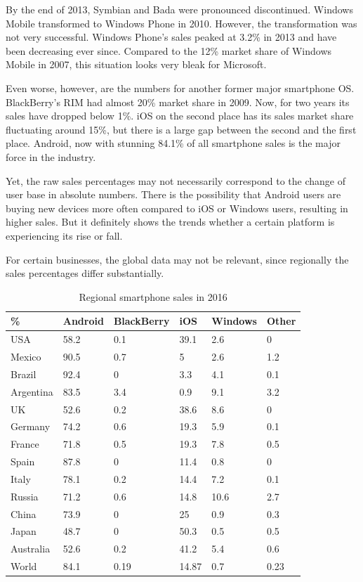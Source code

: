 \documentclass[english,master,public,dept460,male,cpdeclaration,oneside]{diploma}
\begin{document}
By the end of 2013, Symbian and Bada were pronounced discontinued. Windows Mobile transformed to Windows Phone in 2010. However, the transformation was not very successful. Windows Phone’s sales peaked at 3.2\% in 2013 and have been decreasing ever since. Compared to the 12\% market share of Windows Mobile in 2007, this situation looks very bleak for Microsoft. 

Even worse, however, are the numbers for another former major smartphone OS. BlackBerry’s RIM had almost 20\% market share in 2009. Now, for two years its sales have dropped below 1\%. iOS on the second place has its sales market share fluctuating around 15\%, but there is a large gap between the second and the first place. Android, now with stunning 84.1\% of all smartphone sales is the major force in the industry. 

Yet, the raw sales percentages may not necessarily correspond to the change of user base in absolute numbers. There is the possibility that Android users are buying new devices more often compared to iOS or Windows users, resulting in higher sales. But it definitely shows the trends whether a certain platform is experiencing its rise or fall.

For certain businesses, the global data may not be relevant, since regionally the sales percentages differ substantially.

\begin{table}
	\centering
	\caption{Regional smartphone sales in 2016}
	\begin{tabular}{l l l l l l}
		\toprule
		\% & Android & BlackBerry & iOS & Windows & Other \\
		\midrule
		USA & 58.2 & 0.1 & 39.1 & 2.6 & 0 \\
		Mexico & 90.5 & 0.7 & 5 & 2.6 & 1.2 \\
		Brazil & 92.4 & 0 & 3.3 & 4.1 & 0.1 \\
		Argentina & 83.5 & 3.4 & 0.9 & 9.1 & 3.2 \\
		UK & 52.6 & 0.2 & 38.6 & 8.6 & 0 \\
		Germany & 74.2 & 0.6 & 19.3 & 5.9 & 0.1 \\
		France & 71.8 & 0.5 & 19.3 & 7.8 & 0.5 \\
		Spain & 87.8 & 0 & 11.4 & 0.8 & 0 \\
		Italy & 78.1 & 0.2 & 14.4 & 7.2 & 0.1\\
		Russia & 71.2 & 0.6 & 14.8 & 10.6 & 2.7 \\
		China & 73.9 & 0 & 25 & 0.9 & 0.3 \\
		Japan & 48.7 & 0 & 50.3 & 0.5 & 0.5 \\
		Australia & 52.6 & 0.2 & 41.2 & 5.4 & 0.6 \\
		World & 84.1 & 0.19 & 14.87 & 0.7 & 0.23 \\
		\midrule
	\end{tabular}
\end{table}
\end{document}

